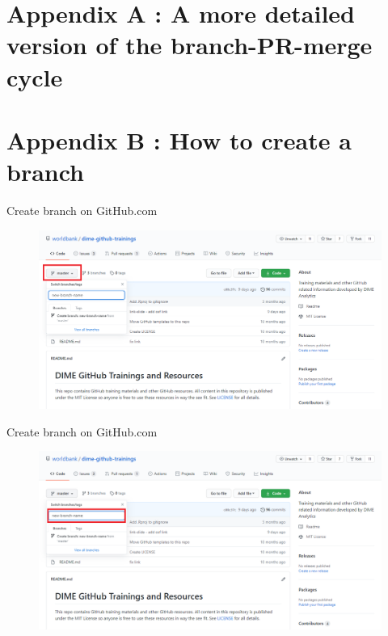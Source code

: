 \documentclass[aspectratio=169]{beamer} %
\begin{document}


\section{Appendix A : A more detailed version of the branch-PR-merge cycle }

\section{Appendix B : How to create a branch}

\begin{frame}{Create branch on GitHub.com}
\label{new-branch}

\begin{figure}
	\centering
	\includegraphics[width=.9\textwidth]{./img/new-branch-1.png}
\end{figure}
\end{frame}

\begin{frame}{Create branch on GitHub.com}
\begin{figure}
	\centering
	\includegraphics[width=.9\textwidth]{./img/new-branch-2.png}
\end{figure}
\end{frame}
\end{document}
